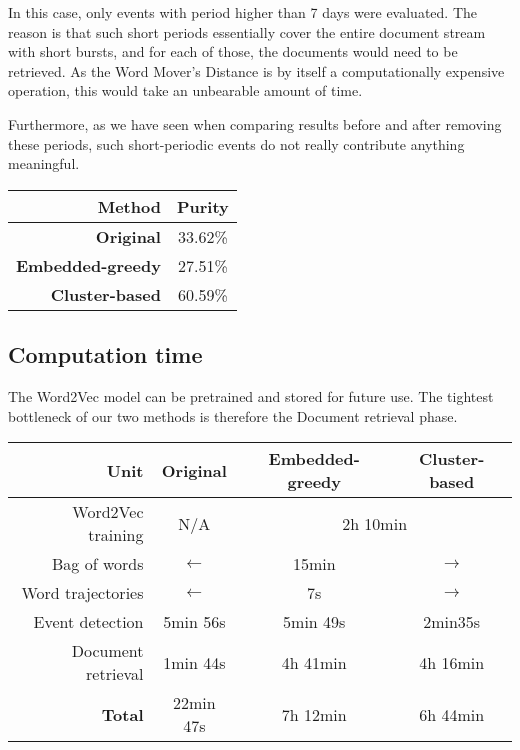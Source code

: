 \documentclass[a4paper]{article}
\begin{document}
In this case, only events with period higher than 7 days were evaluated. The reason is that such short periods essentially cover the entire document stream with short bursts, and for each of those, the documents would need to be retrieved. As the Word Mover's Distance \cite{wmd} is by itself a computationally expensive operation, this would take an unbearable amount of time.

Furthermore, as we have seen when comparing results before and after removing these periods, such short-periodic events do not really contribute anything meaningful.

\begin{center}
\begin{tabular}{r c} \toprule[1.5pt]
\bf Method & Purity \\ \midrule
\bf Original & 33.62\% \\
\bf Embedded-greedy & 27.51\% \\
\bf Cluster-based & 60.59\% \\ \bottomrule[1.25pt]
\end{tabular}
\end{center}


\subsection{Computation time}
The Word2Vec model can be pretrained and stored for future use. The tightest bottleneck of our two methods is therefore the Document retrieval phase.

\begin{center}
\begin{tabular}{r c c c} \toprule[1.5pt]
\bf Unit & \bf Original & \bf Embedded-greedy & \bf Cluster-based \\ \midrule
Word2Vec training & N/A & \multicolumn{2}{c}{2h 10min} \\
Bag of words & $\longleftarrow$ & {15min} & $\longrightarrow$ \\
Word trajectories & $\longleftarrow$ & 7s & $\longrightarrow$ \\
Event detection & 5min 56s & 5min 49s & 2min35s \\
Document retrieval & 1min 44s & 4h 41min & 4h 16min \\ \midrule
\bf Total & 22min 47s & 7h 12min & 6h 44min \\ \bottomrule[1.25pt]
\end{tabular}
\end{center}
\end{document}
